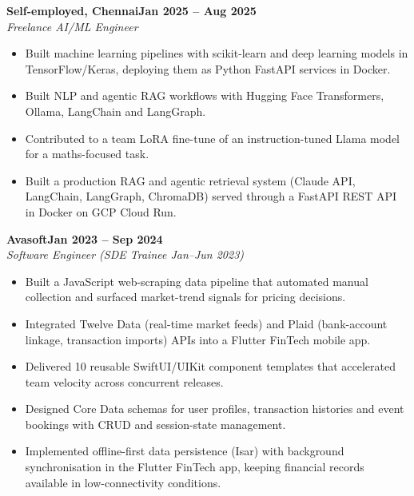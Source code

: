 \documentclass[a4paper,11pt]{article}
\newcommand{\entry}[4]{\needspace{4\baselineskip}\noindent\textbf{#1}\hfill\textbf{#2}\\ \textit{#3}\hfill\textit{#4}\par}
\begin{document}
\vspace{4pt}
\entry{Self-employed, Chennai}{Jan 2025 – Aug 2025}{Freelance AI/ML Engineer}{}
\begin{itemize}
  \item Built machine learning pipelines with scikit-learn and deep learning models in TensorFlow/Keras, deploying them as Python FastAPI services in Docker.
  \item Built NLP and agentic RAG workflows with Hugging Face Transformers, Ollama, LangChain and LangGraph.
  \item Contributed to a team LoRA fine-tune of an instruction-tuned Llama model for a maths-focused task.
  \item Built a production RAG and agentic retrieval system (Claude API, LangChain, LangGraph, ChromaDB) served through a FastAPI REST API in Docker on GCP Cloud Run.
\end{itemize}
\vspace{4pt}
\entry{Avasoft}{Jan 2023 – Sep 2024}{Software Engineer (SDE Trainee Jan–Jun 2023)}{}
\begin{itemize}
  \item Built a JavaScript web-scraping data pipeline that automated manual collection and surfaced market-trend signals for pricing decisions.
  \item Integrated Twelve Data (real-time market feeds) and Plaid (bank-account linkage, transaction imports) APIs into a Flutter FinTech mobile app.
  \item Delivered 10 reusable SwiftUI/UIKit component templates that accelerated team velocity across concurrent releases.
  \item Designed Core Data schemas for user profiles, transaction histories and event bookings with CRUD and session-state management.
  \item Implemented offline-first data persistence (Isar) with background synchronisation in the Flutter FinTech app, keeping financial records available in low-connectivity conditions.
\end{itemize}

\end{document}
